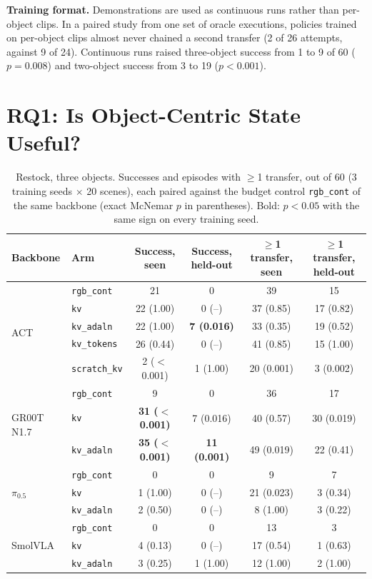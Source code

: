 \documentclass[letterpaper, 10pt, journal, twoside]{IEEEtran}
\newcommand{\arm}[1]{\texttt{#1}}
\begin{document}
\textbf{Training format.} Demonstrations are used as continuous runs rather
than per-object clips. In a paired study from one set of oracle executions,
policies trained on per-object clips almost never chained a second transfer
(2 of 26 attempts, against 9 of 24). Continuous runs raised three-object
success from 1 to 9 of 60 ($p=0.008$) and two-object success from 3 to 19
($p<0.001$).

\section{RQ1: Is Object-Centric State Useful?}
\label{sec:rq1}

\begin{table}[t]
\centering
\caption{Restock, three objects. Successes and episodes with $\geq$1
transfer, out of 60 (3 training seeds $\times$ 20 scenes), each paired
against the budget control \arm{rgb\_cont} of the same backbone (exact
McNemar $p$ in parentheses). Bold: $p<0.05$ with the same sign on every
training seed.}
\label{tab:rq1}
\footnotesize
\begin{tabular}{@{}llcccc@{}}
\toprule
Backbone & Arm & Success, seen & Success, held-out & $\geq$1 transfer, seen & $\geq$1 transfer, held-out \\
\midrule
\multirow{5}{*}{ACT}
 & \arm{rgb\_cont}  & 21 & 0 & 39 & 15 \\
 & \arm{kv}         & 22 (1.00) & 0 (--) & 37 (0.85) & 17 (0.82) \\
 & \arm{kv\_adaln}  & 22 (1.00) & \textbf{7 (0.016)} & 33 (0.35) & 19 (0.52) \\
 & \arm{kv\_tokens} & 26 (0.44) & 0 (--) & 41 (0.85) & 15 (1.00) \\
 & \arm{scratch\_kv}& 2 ($<$0.001) & 1 (1.00) & 20 (0.001) & 3 (0.002) \\
\midrule
\multirow{3}{*}{GR00T N1.7}
 & \arm{rgb\_cont}  & 9 & 0 & 36 & 17 \\
 & \arm{kv}         & \textbf{31 ($<$0.001)} & 7 (0.016) & 40 (0.57) & 30 (0.019) \\
 & \arm{kv\_adaln}  & \textbf{35 ($<$0.001)} & \textbf{11 (0.001)} & 49 (0.019) & 22 (0.41) \\
\midrule
\multirow{3}{*}{$\pi_{0.5}$}
 & \arm{rgb\_cont}  & 0 & 0 & 9 & 7 \\
 & \arm{kv}         & 1 (1.00) & 0 (--) & 21 (0.023) & 3 (0.34) \\
 & \arm{kv\_adaln}  & 2 (0.50) & 0 (--) & 8 (1.00) & 3 (0.22) \\
\midrule
\multirow{3}{*}{SmolVLA}
 & \arm{rgb\_cont}  & 0 & 0 & 13 & 3 \\
 & \arm{kv}         & 4 (0.13) & 0 (--) & 17 (0.54) & 1 (0.63) \\
 & \arm{kv\_adaln}  & 3 (0.25) & 1 (1.00) & 12 (1.00) & 2 (1.00) \\
\bottomrule
\end{tabular}
\end{table}
\end{document}
